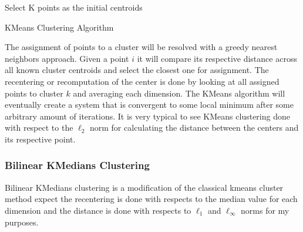 \documentclass[a4paper,12pt]{article}
\numberwithin{equation}{section}
\begin{document}
\begin{algorithm}[]
 Select K points as the initial centroids\;
\caption{KMeans Clustering Algorithm}
\end{algorithm} 
\newline
The assignment of points to a cluster will be resolved with a greedy nearest neighbors approach. Given a point $i$ it will compare its respective distance across all known cluster centroids and select the closest one for assignment. The recentering or recomputation of the center is done by looking at all assigned points to cluster $k$ and averaging each dimension. The KMeans algorithm will eventually create a system that is convergent to some local minimum after some arbitrary amount of iterations. It is very typical to see KMeans clustering done with respect to the $\ell_2 $ norm for calculating the distance between the centers and its respective point.

\subsubsection{Bilinear KMedians Clustering}
Bilinear KMedians clustering is a modification of the classical kmeans cluster method expect the recentering is done with respects to the median value for each dimension and the distance is done with respects to $\ell_1$ and $\ell_\infty$ norms for my purposes. \\
\end{document}

